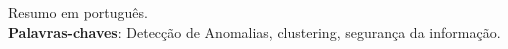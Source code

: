 \par
\begin{resumo}
Resumo em português.
\vspace{\onelineskip} \\
\noindent
\textbf{Palavras-chaves}: Detecção de Anomalias, clustering, segurança da informação.
\end{resumo}

